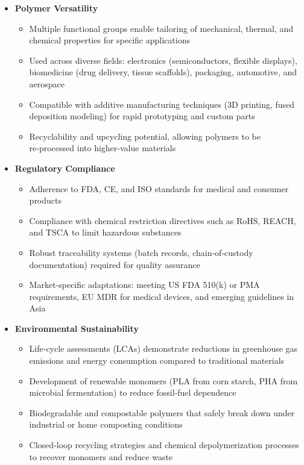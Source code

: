 \documentclass[11pt,a4paper]{article}
\begin{document}
\begin{itemize}
\item \textbf{Polymer Versatility}
  \begin{itemize}
\item Multiple functional groups enable tailoring of mechanical, thermal, and chemical properties for specific applications
\item Used across diverse fields: electronics (semiconductors, flexible displays), biomedicine (drug delivery, tissue scaffolds), packaging, automotive, and aerospace
\item Compatible with additive manufacturing techniques (3D printing, fused deposition modeling) for rapid prototyping and custom parts
\item Recyclability and upcycling potential, allowing polymers to be re‑processed into higher‑value materials
  \end{itemize}
\item \textbf{Regulatory Compliance}
  \begin{itemize}
\item Adherence to FDA, CE, and ISO standards for medical and consumer products
\item Compliance with chemical restriction directives such as RoHS, REACH, and TSCA to limit hazardous substances
\item Robust traceability systems (batch records, chain‑of‑custody documentation) required for quality assurance
\item Market‑specific adaptations: meeting US FDA 510(k) or PMA requirements, EU MDR for medical devices, and emerging guidelines in Asia
  \end{itemize}
\item \textbf{Environmental Sustainability}
  \begin{itemize}
\item Life‑cycle assessments (LCAs) demonstrate reductions in greenhouse gas emissions and energy consumption compared to traditional materials
\item Development of renewable monomers (PLA from corn starch, PHA from microbial fermentation) to reduce fossil‑fuel dependence
\item Biodegradable and compostable polymers that safely break down under industrial or home composting conditions
\item Closed‑loop recycling strategies and chemical depolymerization processes to recover monomers and reduce waste
  \end{itemize}

\end{itemize}
\end{document}
